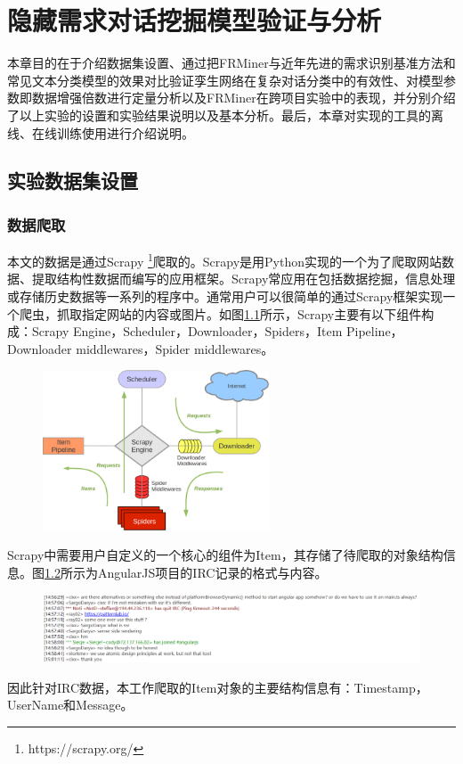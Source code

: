 \chapter{隐藏需求对话挖掘模型验证与分析}
本章目的在于介绍数据集设置、通过把FRMiner与近年先进的需求识别基准方法和常见文本分类模型的效果对比验证孪生网络在复杂对话分类中的有效性、对模型参数即数据增强倍数进行定量分析以及FRMiner在跨项目实验中的表现，并分别介绍了以上实验的设置和实验结果说明以及基本分析。最后，本章对实现的{\tool}工具的离线、在线训练使用进行介绍说明。

\section{实验数据集设置}
\subsection{数据爬取}
本文的数据是通过Scrapy \footnote{https://scrapy.org/}爬取的。Scrapy是用Python实现的一个为了爬取网站数据、提取结构性数据而编写的应用框架。Scrapy常应用在包括数据挖掘，信息处理或存储历史数据等一系列的程序中。通常用户可以很简单的通过Scrapy框架实现一个爬虫，抓取指定网站的内容或图片。如图\ref{fig:scrapy}所示，Scrapy主要有以下组件构成：Scrapy Engine，Scheduler，Downloader，Spiders，Item Pipeline，Downloader middlewares，Spider middlewares。
\begin{figure}[htbp]
    \centering
    \includegraphics[width=0.6\textwidth]{Img/scrapy.png}
    \label{fig:scrapy}
\end{figure}
Scrapy中需要用户自定义的一个核心的组件为Item，其存储了待爬取的对象结构信息。图\ref{fig:echelog}所示为AngularJS项目的IRC记录的格式与内容。
\begin{figure}[htbp]
    \centering
    \includegraphics[width=\textwidth]{Img/echelog.png}
    \label{fig:echelog}
\end{figure}
因此针对IRC数据，本工作爬取的Item对象的主要结构信息有：Timestamp，UserName和Message。

